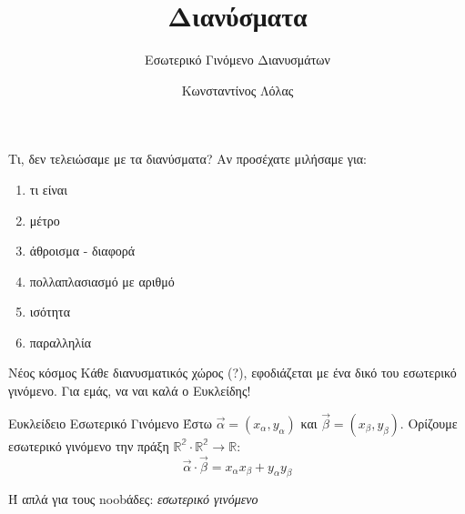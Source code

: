 \documentclass[greek]{beamer}
\title{Διανύσματα}
\subtitle{Εσωτερικό Γινόμενο Διανυσμάτων}
\author[Λόλας]{Κωνσταντίνος Λόλας}
\institute[$10^ο$ ΓΕΛ]{$10^ο$ ΓΕΛ Θεσσαλονίκης}
\date{}
\begin{document}
\begin{frame}
      \titlepage
\end{frame}
\begin{frame}{Τι, δεν τελειώσαμε με τα διανύσματα?}
      Αν προσέχατε μιλήσαμε για:
      \begin{enumerate}
            \item τι είναι
            \item μέτρο
            \item άθροισμα - διαφορά
            \item πολλαπλασιασμό με αριθμό
            \item ισότητα
            \item παραλληλία
      \end{enumerate}
\end{frame}

\begin{frame}{Νέος κόσμος}
      Κάθε διανυσματικός χώρος (?), εφοδιάζεται με ένα δικό του εσωτερικό γινόμενο. Για εμάς, να ναι καλά ο Ευκλείδης!
      \begin{block}{Ευκλείδειο Εσωτερικό Γινόμενο}
            Έστω $\vec{α}=(x_α,y_α)$ και $\vec{β}=(x_β,y_β)$. Ορίζουμε εσωτερικό γινόμενο την πράξη $\mathbb{R^2}\cdot\mathbb{R^2}\to\mathbb{R}$:
            $$\vec{α}\cdot\vec{β}=x_αx_β+y_αy_β$$
      \end{block}
      Ή απλά για τους noobάδες: \emph{εσωτερικό γινόμενο}
\end{frame}
\end{document}
